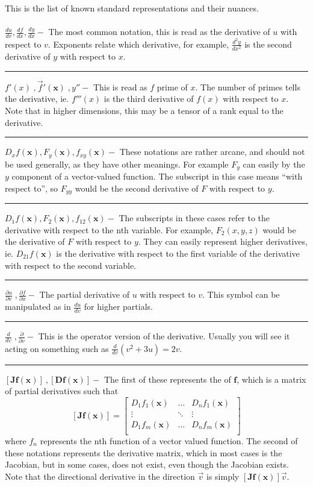 \documentclass[12pt]{article}
\newcommand{\pt}{\mathbf}
\begin{document}

This is the list of known standard representations and their nuances.\\
\\
$\frac{du}{dv}, \frac{df}{dx}, \frac{dy}{dx}-$ The most common notation, this is read as the derivative of $u$ with respect to $v$. Exponents relate which derivative, for example, $\frac{d^2y}{dx^2}$ is the second derivative of $y$ with respect to $x$.\\
\hrule
$f'(x)\; ,\vec{f}'(\pt{x})\;, y''-$ This is read as $f$ prime of $x$. The number of primes tells the derivative, ie. $f'''(x)$ is the third derivative of $f(x)$ with respect to $x$. Note that in higher dimensions, this may be a tensor of a rank equal to the derivative.\\
\hrule
$D_xf(\pt{x}), F_y(\pt{x}), f_{xy}(\pt{x})-$ These notations are rather arcane, and should not be used generally, as they have other meanings. For example $F_y$ can easily by the $y$ component of a vector-valued function. The subscript in this case means ``with respect to'', so $F_{yy}$ would be the second derivative of $F$ with respect to $y$.\\
\hrule
$D_1f(\pt{x}), F_2(\pt{x}), f_{12}(\pt{x})-$ The subscripts in these cases refer to the derivative with respect to the nth variable. For example, $F_2(x,y,z)$ would be the derivative of $F$ with respect to $y$. They can easily represent higher derivatives, ie. $D_{21}f(\pt{x})$ is the derivative with respect to the first variable of the derivative with respect to the second variable.\\
\hrule
$\frac{\partial u}{\partial v}\; ,\frac{\partial f}{\partial x}-$ The partial derivative of $u$ with respect to $v$. This symbol can be manipulated as in $\frac{du}{dv}$ for higher partials.\\
\hrule
$\frac{d}{dv}\;,\frac{\partial}{\partial v}-$ This is the operator version of the derivative. Usually you will see it acting on something such as $\frac{d}{dv}(v^2+3u) = 2v$.\\
\hrule
$[\mathbf{Jf}(\pt{x})]\:,[\mathbf{Df}(\pt{x})]-$ The first of these represents the  of $\mathbf{f}$, which is a matrix of partial derivatives such that
$$[\mathbf{Jf}(\pt{x})] = \left[\begin{array}{ccc}
D_1f_1(\pt{x}) & \dots & D_nf_1(\pt{x})\\
\vdots & \ddots & \vdots\\
D_1f_m(\pt{x}) & \dots & D_nf_m(\pt{x})\\
\end{array}\right]$$
where $f_n$ represents the nth function of a vector valued function. The second of these notations represents the derivative matrix, which in most cases is the Jacobian, but in some cases, does not exist, even though the Jacobian exists. Note that the directional derivative in the direction $\vec{v}$ is simply $[\mathbf{Jf}(\pt{x})]\vec{v}$.\\
\end{document}

